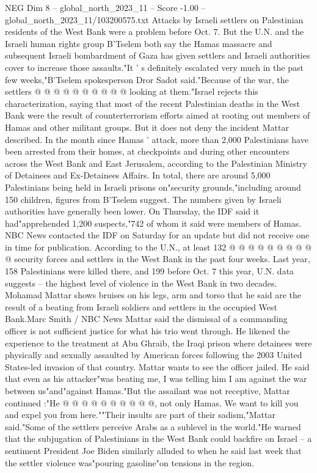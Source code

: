 \begin{textsample}{NEG Dim 8 – global\_north\_2023\_11 – Score -1.00 – global\_north\_2023\_11/103200575.txt}
Attacks by Israeli settlers on Palestinian residents of the West Bank were a problem before Oct. 7.
But the U.N. and the Israeli human rights group B'Tselem both say the Hamas massacre and subsequent Israeli bombardment of Gaza has given settlers and Israeli authorities cover to increase those assaults."It ' s definitely escalated very much in the past few weeks,"B'Tselem spokesperson Dror Sadot said."Because of the war, the settlers @ @ @ @ @ @ @ @ @ @ looking at them."Israel rejects this characterization, saying that most of the recent Palestinian deaths in the West Bank were the result of counterterrorism efforts aimed at rooting out members of Hamas and other militant groups.
But it does not deny the incident Mattar described.
In the month since Hamas ' attack, more than 2,000 Palestinians have been arrested from their homes, at checkpoints and during other encounters across the West Bank and East Jerusalem, according to the Palestinian Ministry of Detainees and Ex-Detainees Affairs.
In total, there are around 5,000 Palestinians being held in Israeli prisons on"security grounds,"including around 150 children, figures from B'Tselem suggest.
The numbers given by Israeli authorities have generally been lower.
On Thursday, the IDF said it had"apprehended 1,200 suspects,"742 of whom it said were members of Hamas.
NBC News contacted the IDF on Saturday for an update but did not receive one in time for publication.
According to the U.N., at least 132 @ @ @ @ @ @ @ @ @ @ security forces and settlers in the West Bank in the past four weeks.
Last year, 158 Palestinians were killed there, and 199 before Oct. 7 this year, U.N. data suggests -- the highest level of violence in the West Bank in two decades.
Mohamad Mattar shows bruises on his legs, arm and torso that he said are the result of a beating from Israeli soldiers and settlers in the occupied West Bank.Marc Smith / NBC News Mattar said the dismissal of a commanding officer is not sufficient justice for what his trio went through.
He likened the experience to the treatment at Abu Ghraib, the Iraqi prison where detainees were physically and sexually assaulted by American forces following the 2003 United States-led invasion of that country.
Mattar wants to see the officer jailed.
He said that even as his attacker"was beating me, I was telling him I am against the war between us"and"against Hamas."But the assailant was not receptive, Mattar continued :"He @ @ @ @ @ @ @ @ @ @, not only Hamas.
We want to kill you and expel you from here.""Their insults are part of their sadism,"Mattar said."Some of the settlers perceive Arabs as a sublevel in the world."He warned that the subjugation of Palestinians in the West Bank could backfire on Israel -- a sentiment President Joe Biden similarly alluded to when he said last week that the settler violence was"pouring gasoline"on tensions in the region.

\end{textsample}
